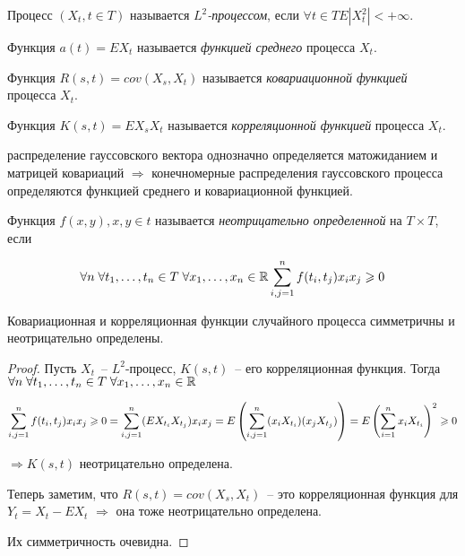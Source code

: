 \begin{definition}
Процесс $(X_t, t \in T)$ называется \emph{$L^2$-процессом}, если $\forall t \in T E|X_t^2| < +\infty$.

Функция $a(t) = EX_t$ называется \emph{функцией среднего} процесса $X_t$.

Функция $R(s,t) = cov(X_s, X_t)$ называется \emph{ковариационной функцией} процесса $X_t$.

Функция $K(s,t) = EX_sX_t$ называется \emph{корреляционной функцией} процесса $X_t$.
\end{definition}

\begin{remark}
распределение гауссовского вектора однозначно определяется матожиданием и матрицей ковариаций
$\Rightarrow$ конечномерные распределения гауссовского процесса определяются функцией среднего
и ковариационной функцией.
\end{remark}

\begin{definition}
Функция $f(x, y), x, y \in t$ называется \emph{неотрицательно определенной} на $T\times T$, если

$$\forall n \; \forall t_{1}, \dots, t_{n} \in T \; \forall x_{1}, \dots, x_{n} \in \mathbb{R}
\sum_{i, j = 1}^{n} f(t_i, t_j) x_i x_j \geqslant 0$$
\end{definition}

\begin{lem}
Ковариационная и корреляционная функции случайного процесса симметричны и неотрицательно
определены.
\end{lem}
\begin{proof}
Пусть $X_t$~-- $L^2$-процесс, $K(s, t)$~-- его корреляционная функция. Тогда
$\forall n \; \forall t_{1}, \dots, t_{n} \in T \; \forall x_{1}, \dots, x_{n} \in \mathbb{R}$

$$\sum_{i, j = 1}^{n} f(t_i, t_j) x_i x_j \geqslant 0 = \sum_{i,j=1}^n(EX_{t_i}X_{t_j})x_i x_j =
E \left( \sum_{i,j=1}^n (x_iX_{t_i}) (x_j X_{t_j}) \right) =
E\left( \sum_{i=1}^n x_i X_{t_i} \right)^2 \geqslant 0$$

$\Rightarrow K(s,t)$ неотрицательно определена.

Теперь заметим, что  $R(s,t) = cov(X_s, X_t)$~-- это корреляционная функция для  $Y_t = X_t - EX_t$
$\Rightarrow$ она тоже неотрицательно определена.

Их симметричность очевидна.
\end{proof}


